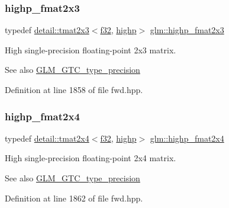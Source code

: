 \subsubsection{\texorpdfstring{highp\+\_\+fmat2x3}{highp\_fmat2x3}}
{\footnotesize\ttfamily typedef \hyperlink{structglm_1_1detail_1_1tmat2x3}{detail\+::tmat2x3}$<$\hyperlink{group__gtc__type__precision_ga0ec999b57f5330d9021256e96038df04}{f32}, \hyperlink{namespaceglm_a0f04f086094c747d227af4425893f545ac6f7eab42eacbb10d59a58e95e362074}{highp}$>$ \hyperlink{group__gtc__type__precision_ga53c126d1650b460bc7496a6fd5e5e764}{glm\+::highp\+\_\+fmat2x3}}

High single-\/precision floating-\/point 2x3 matrix. \begin{DoxySeeAlso}{See also}
\hyperlink{group__gtc__type__precision}{G\+L\+M\+\_\+\+G\+T\+C\+\_\+type\+\_\+precision} 
\end{DoxySeeAlso}


Definition at line 1858 of file fwd.\+hpp.

\mbox{\label{group__gtc__type__precision_ga5df8430c47272adc901ef224d85a9c4d}} 
\subsubsection{\texorpdfstring{highp\+\_\+fmat2x4}{highp\_fmat2x4}}
{\footnotesize\ttfamily typedef \hyperlink{structglm_1_1detail_1_1tmat2x4}{detail\+::tmat2x4}$<$\hyperlink{group__gtc__type__precision_ga0ec999b57f5330d9021256e96038df04}{f32}, \hyperlink{namespaceglm_a0f04f086094c747d227af4425893f545ac6f7eab42eacbb10d59a58e95e362074}{highp}$>$ \hyperlink{group__gtc__type__precision_ga5df8430c47272adc901ef224d85a9c4d}{glm\+::highp\+\_\+fmat2x4}}

High single-\/precision floating-\/point 2x4 matrix. \begin{DoxySeeAlso}{See also}
\hyperlink{group__gtc__type__precision}{G\+L\+M\+\_\+\+G\+T\+C\+\_\+type\+\_\+precision} 
\end{DoxySeeAlso}


Definition at line 1862 of file fwd.\+hpp.

\mbox{\label{group__gtc__type__precision_ga3ff9af2eba26aa6df92aa73e1083e81e}} 
